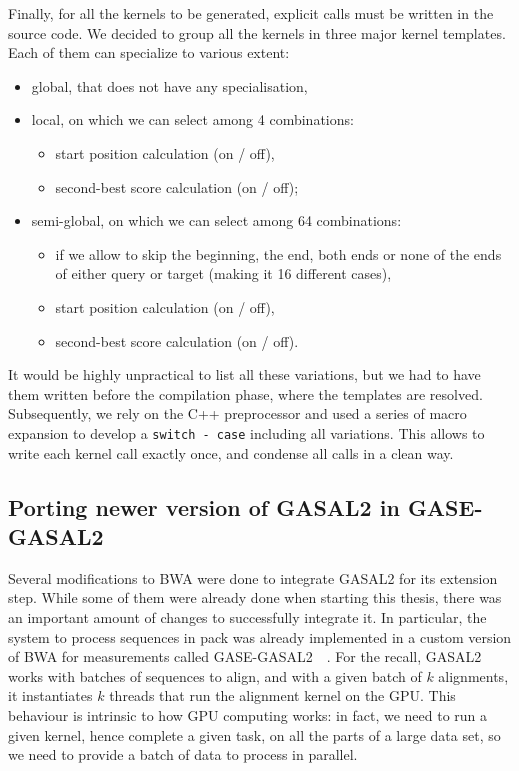Finally, for all the kernels to be generated, explicit calls must be written in the source code. We decided to group all the kernels in three major kernel templates. Each of them can specialize to various extent:

\begin{itemize}
	\item global, that does not have any specialisation,
	\item local, on which we can select among 4 combinations:
	\begin{itemize}
		\item start position calculation (on / off),
		\item second-best score calculation (on / off);
	\end{itemize}
	\item semi-global, on which we can select among 64 combinations:
	\begin{itemize}
		\item if we allow to skip the beginning, the end, both ends or none of the ends of either query or target (making it 16 different cases),
		\item start position calculation (on / off),
		\item second-best score calculation (on / off).
	\end{itemize}
\end{itemize}

It would be highly unpractical to list all these variations, but we had to have them written before the compilation phase, where the templates are resolved. Subsequently, we rely on the C++ preprocessor and used a series of macro expansion to develop a \verb|switch - case| including all variations. This allows to write each kernel call exactly once, and condense all calls in a clean way.

\subsection{Porting newer version of GASAL2 in GASE-GASAL2}

Several modifications to BWA were done to integrate GASAL2 for its extension step. While some of them were already done when starting this thesis, there was an important amount of changes to successfully integrate it. In particular, the system to process sequences in pack was already implemented in a custom version of BWA for measurements called GASE-GASAL2~\cite{Ahmed:gase-gasal2}~\cite{Ahmed:GASE}. For the recall, GASAL2 works with batches of sequences to align, and with a given batch of $k$ alignments, it instantiates $k$ threads that run the alignment kernel on the GPU. This behaviour is intrinsic to how GPU computing works: in fact, we need to run a given kernel, hence complete a given task, on all the parts of a large data set, so we need to provide a batch of data to process in parallel.

